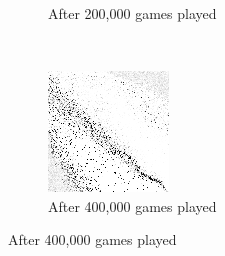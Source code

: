 \begin{figure}
\begin{subfigure}[t]{0.2\textwidth}
	\caption{After 200,000 games played}
	\end{subfigure}
	~
	\begin{subfigure}[t]{0.2\textwidth}
	\includegraphics[width=\textwidth]{images/findings/round2/flipbook/winner/checkpoint_400000.png}
	\caption{After 400,000 games played}
	\end{subfigure}


\end{figure}
